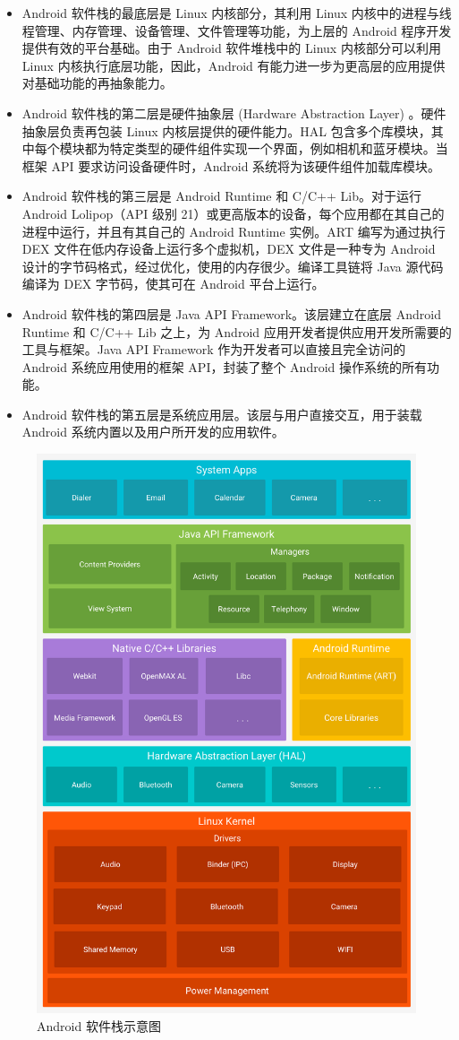 \begin{itemize}
    \item Android 软件栈的最底层是 Linux 内核部分，其利用 Linux 内核中的进程与线程管理、内存管理、设备管理、文件管理等功能，为上层的 Android 程序开发提供有效的平台基础。由于 Android 软件堆栈中的 Linux 内核部分可以利用 Linux 内核执行底层功能，因此，Android 有能力进一步为更高层的应用提供对基础功能的再抽象能力。
    \item Android 软件栈的第二层是硬件抽象层 (Hardware Abstraction Layer) 。硬件抽象层负责再包装 Linux 内核层提供的硬件能力。HAL 包含多个库模块，其中每个模块都为特定类型的硬件组件实现一个界面，例如相机和蓝牙模块。当框架 API 要求访问设备硬件时，Android 系统将为该硬件组件加载库模块。
    \item Android 软件栈的第三层是 Android Runtime 和 C/C++ Lib。对于运行 Android Lolipop（API 级别 21）或更高版本的设备，每个应用都在其自己的进程中运行，并且有其自己的 Android Runtime 实例。ART 编写为通过执行 DEX 文件在低内存设备上运行多个虚拟机，DEX 文件是一种专为 Android 设计的字节码格式，经过优化，使用的内存很少。编译工具链将 Java 源代码编译为 DEX 字节码，使其可在 Android 平台上运行。
    \item Android 软件栈的第四层是 Java API Framework。该层建立在底层 Android Runtime 和 C/C++ Lib 之上，为 Android 应用开发者提供应用开发所需要的工具与框架。Java API Framework 作为开发者可以直接且完全访问的 Android 系统应用使用的框架 API，封装了整个 Android 操作系统的所有功能。
    \item Android 软件栈的第五层是系统应用层。该层与用户直接交互，用于装载 Android 系统内置以及用户所开发的应用软件。
\end{itemize}

\begin{figure}[htb]
    \centering
    \includegraphics[width=.7\textwidth]{figures/android-stack_2x.png}
    \caption{Android 软件栈示意图}
    \label{fig:android-stack}
\end{figure}

